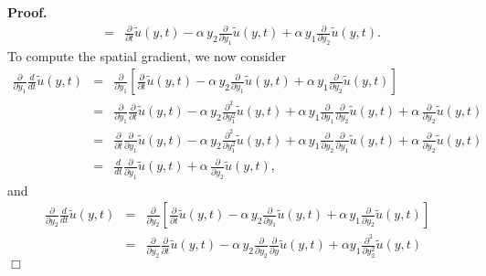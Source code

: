 \documentclass[12pt]{article}
\newenvironment{proof}{\textbf{Proof.}}{\hfill $\Box$}
\numberwithin{equation}{section}
\begin{document}
\begin{proof}
\begin{eqnarray*}
    & = & \frac{\partial}{\partial t} \widetilde{u}(y,t) -
          \alpha \, y_2 \frac{\partial}{\partial y_1}
          \widetilde{u}(y,t) +
          \alpha \, y_1 \frac{\partial}{\partial y_2}
          \widetilde{u}(y,t).
  \end{eqnarray*}
  To compute the spatial gradient, we now consider
  \begin{eqnarray*}
    \frac{\partial}{\partial y_1} \frac{d}{dt}
    \widetilde{u}(y,t)
    & = & \frac{\partial}{\partial y_1} \left[
          \frac{\partial}{\partial t} \widetilde{u}(y,t) -
          \alpha \, y_2 \frac{\partial}{\partial y_1}
          \widetilde{u}(y,t) +
          \alpha \, y_1 \frac{\partial}{\partial y_2}
          \widetilde{u}(y,t) \right] \\
    & = & \frac{\partial}{\partial y_1} \frac{\partial}{\partial t}
          \widetilde{u}(y,t) -
          \alpha \, y_2 \frac{\partial^2}{\partial y_1^2}
          \widetilde{u}(y,t) +
          \alpha \, y_1 \frac{\partial}{\partial y_1}
          \frac{\partial}{\partial y_2} \widetilde{u}(y,t)
          + \alpha \, \frac{\partial}{\partial y_2}
          \widetilde{u}(y,t) \\
    & = & \frac{\partial}{\partial t} \frac{\partial}{\partial y_1} 
          \widetilde{u}(y,t) -
          \alpha \, y_2 \frac{\partial^2}{\partial y_1^2}
          \widetilde{u}(y,t) +
          \alpha \, y_1 \frac{\partial}{\partial y_2}
          \frac{\partial}{\partial y_1} \widetilde{u}(y,t)
          + \alpha \, \frac{\partial}{\partial y_2}
          \widetilde{u}(y,t) \\
    & = & \frac{d}{dt} \frac{\partial}{\partial y_1}
          \widetilde{u}(y,t)
          + \alpha \, \frac{\partial}{\partial y_2}
          \widetilde{u}(y,t),
  \end{eqnarray*}
  and
  \begin{eqnarray*}
    \frac{\partial}{\partial y_2} \frac{d}{dt}
    \widetilde{u}(y,t)
    & = & \frac{\partial}{\partial y_2} \left[
          \frac{\partial}{\partial t} \widetilde{u}(y,t) -
          \alpha \, y_2 \frac{\partial}{\partial y_1}
          \widetilde{u}(y,t) +
          \alpha \, y_1 \frac{\partial}{\partial y_2}
          \widetilde{u}(y,t) \right] \\
    & = & \frac{\partial}{\partial y_2} \frac{\partial}{\partial t}
          \widetilde{u}(y,t) -
          \alpha \, y_2 \frac{\partial}{\partial y_2}
          \frac{\partial}{\partial y} \widetilde{u}(y,t)
          + \alpha y_1 \frac{\partial^2}{\partial y_2^2}
          \widetilde{u}(y,t)

\end{eqnarray*}
\end{proof}
\end{document}
